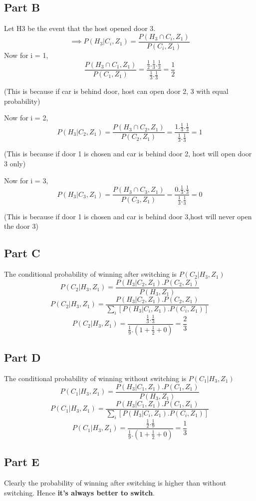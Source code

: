 \documentclass[12pt]{article}
\begin{document}
\subsection*{Part B}
Let H3 be the event that the host opened door 3.
$$\implies P(H_3 | C_i,Z_1) = \frac{P(H_3 \cap C_i,Z_1)}{P(C_i,Z_1)}$$
Now for i = 1,
$$\frac{P(H_3 \cap C_1,Z_1)}{P(C_1,Z_1)} = \frac{\frac{1}{2}.\frac{1}{3}.\frac{1}{3}}{\frac{1}{3}.\frac{1}{3}} = \frac{1}{2}$$
\begin{flushright}
(This is because if car is behind door, host can open door 2, 3 with equal probability)
\end{flushright}
Now for i = 2,
$$P(H_3 | C_2,Z_1) = \frac{P(H_3 \cap C_2,Z_1)}{P(C_2,Z_1)} = \frac{1.\frac{1}{3}.\frac{1}{3}}{\frac{1}{3}.\frac{1}{3}} = 1$$
\begin{flushright}
(This is because if door 1 is chosen and car is behind door 2, host will open door 3 only)
\end{flushright}
Now for i = 3,
$$P(H_3 | C_3,Z_1) = \frac{P(H_3 \cap C_3,Z_1)}{P(C_3,Z_1)} = \frac{0.\frac{1}{3}.\frac{1}{3}}{\frac{1}{3}.\frac{1}{3}} = 0$$
\begin{flushright}
(This is because if door 1 is chosen and car is behind door 3,host will never open the door 3)
\end{flushright}

\subsection*{Part C}
The conditional probability of winning after switching is $P(C_2 | H_3,Z_1)$
$$P(C_2|H_3,Z_1) = \frac{P(H_3|C_2,Z_1).P(C_2,Z_1)}{P(H_3, Z_1)}$$
$$P(C_2|H_3,Z_1) = \frac{P(H_3|C_2,Z_1).P(C_2,Z_1)}{\sum_i[P(H_3|C_i,Z_1).P(C_i,Z_1)]}$$
$$P(C_2|H_3,Z_1) = \frac{\frac{1}{3}.\frac{1}{3}}{\frac{1}{9}.(1+\frac{1}{2}+0)} = \frac{2}{3}$$
\subsection*{Part D}
The conditional probability of winning without switching is $P(C_1 | H_3,Z_1)$
$$P(C_1|H_3,Z_1) = \frac{P(H_3|C_1,Z_1).P(C_1,Z_1)}{P(H_3, Z_1)}$$
$$P(C_1|H_3,Z_1) = \frac{P(H_3|C_1,Z_1).P(C_1,Z_1)}{\sum_i[P(H_3|C_i,Z_1).P(C_i,Z_1)]}$$
$$P(C_1|H_3,Z_1) = \frac{\frac{1}{2}.\frac{1}{9}}{\frac{1}{9}.(1+\frac{1}{2}+0)} = \frac{1}{3}$$
\subsection*{Part E}
Clearly the probability of winning after switching is higher than without switching. Hence \textbf{it's always better to switch}.
\end{document}
